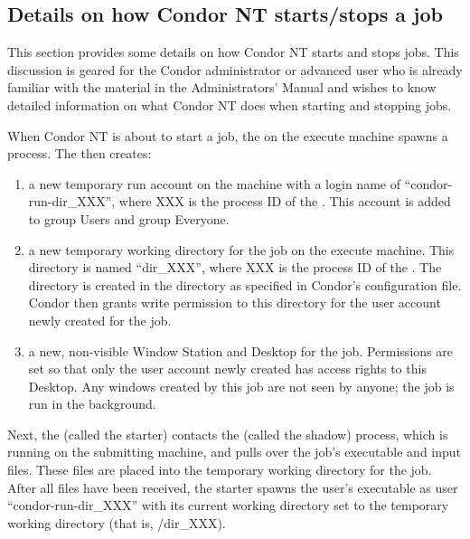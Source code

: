 \subsection{Details on how Condor NT starts/stops a job}

This section provides some details on how Condor NT starts and stops jobs.
This discussion is geared for the Condor administrator or advanced user who is
already familiar with the material in the Administrators' Manual
and wishes to know detailed information on what Condor NT does when
starting and stopping jobs.

When Condor NT is about to start a job, the  on the execute
machine spawns a  process.  The  then
creates:
\begin{enumerate}

\item a new temporary run account on the machine with a login name of
``condor-run-dir\_XXX'', where XXX is the process ID of the
.  This account is added to group Users and group Everyone.

\item a new temporary working directory for the job on the execute machine.
This directory is
named ``dir\_XXX'', where XXX is the process ID of the .
The directory is created in the  directory as
specified in Condor's configuration file.  Condor then grants write
permission to this directory for the user account newly created for the
job.

\item a new, non-visible Window Station and Desktop for the job.
Permissions are set so that only the
user account newly created has access rights to this Desktop.  Any windows
created by this job are not seen by anyone; the job is run in the
background.

\end{enumerate}

Next, the  (called the starter) contacts the 
(called the shadow) process, which is
running on the submitting machine, and pulls over the job's executable and
input files.
These files are placed into the temporary working directory for the job.
After all files have been received,
the starter spawns the user's executable as user ``condor-run-dir\_XXX''
with its current working directory set to the temporary working directory
(that is, /dir\_XXX).

